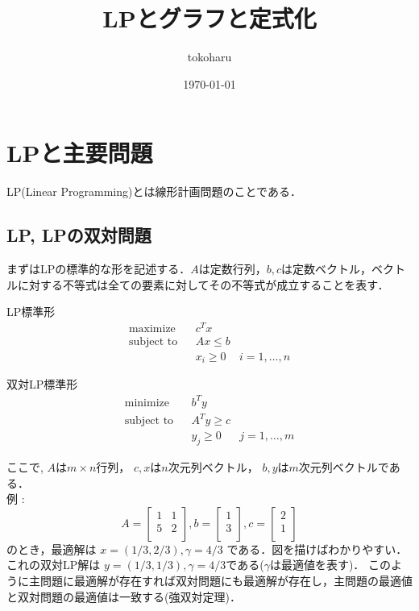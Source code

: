 \documentclass[13pt, a4paper, landscape]{jarticle}
\title{LPとグラフと定式化}
\author{tokoharu}
\date {\today}
\theoremstyle{nonitalic} %
\begin{document}
\maketitle

\section{LPと主要問題}
LP(Linear Programming)とは線形計画問題のことである．
\subsection {LP, LPの双対問題}
まずはLPの標準的な形を記述する．$A$は定数行列，$b, c$は定数ベクトル，ベクトルに対する不等式は全ての要素に対してその不等式が成立することを表す．

LP標準形
\begin{align}
 &&&&&\textrm{maximize}   && c^Tx \\
 &&&&&\textrm{subject to} && Ax \leq b  &&&&&\\
 &&&&&                    && x_i \geq 0 & i = 1,\dots,n &&&&&
\end{align}

双対LP標準形
\begin{align}
 &&&&&\textrm{minimize}   && b^Ty \\
 &&&&&\textrm{subject to} && A^T y \geq c  &&&&&\\
 &&&&&                    && y_j \geq 0 & j = 1,\dots,m &&&&&
\end{align}

 
ここで, $A$は$m\times n$行列， 
$c,x$は$n$次元列ベクトル， 
$b,y$は$m$次元列ベクトルである． \\

例 : 
\begin{equation*}
 A = 
 \left[\begin{array}{cc}
  1 & 1 \\
  5 & 2 \\
 \end{array}\right],
 b = 
 \left[\begin{array}{c}
     1 \\
     3 \\
   \end{array}\right],
 c = 
 \left[\begin{array}{c}
     2 \\
     1 \\
 \end{array}\right]
\end{equation*}
のとき，最適解は $x = (1/3, 2/3) , \gamma = 4/3  $ である．図を描けばわかりやすい．これの双対LP解は
$y = (1/3, 1/3), \gamma = 4/3$である($\gamma$は最適値を表す)．
このように主問題に最適解が存在すれば双対問題にも最適解が存在し，主問題の最適値と双対問題の最適値は一致する(強双対定理)．
\end{document}
